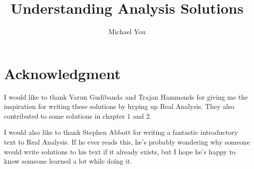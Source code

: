 \documentclass[letterpaper,american,final]{memoir}
\title{Understanding Analysis Solutions}
\author{Michael You}
\date{}
\begin{document}
\begin{titlingpage}
  \maketitle
\end{titlingpage}
\frontmatter
\tableofcontents
\chapter{Acknowledgment}
I would like to thank Varun Gudibanda and Trajan Hammonds for giving
me the inspiration for writing these solutions by hyping up Real Analysis.
They also contributed to some solutions in chapter 1 and 2.

I would also like to thank Stephen Abbott for writing a fantastic introductory text to Real Analysis.
If he ever reads this, he's probably wondering why someone would write solutions to his text if it already
exists, but I hope he's happy to know someone learned a lot while doing it.
\mainmatter








\appendix

\end{document}
